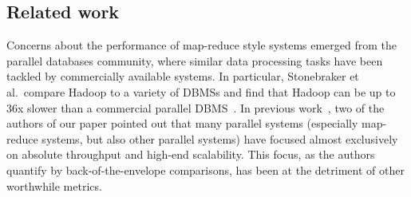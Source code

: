 


\subsection{Related work}
\label{sec:related_work}

Concerns about the performance of map-reduce style systems emerged
from the parallel databases community, where similar data processing
tasks have been tackled by commercially available systems. In
particular, Stonebraker et al.\ compare Hadoop to a variety of DBMSs
and find that Hadoop can be up to 36x slower than a commercial
parallel DBMS~\cite{stonebraker-mr}.  In previous
work~\cite{efficiencymatters}, two of the authors of our paper pointed
out that many parallel systems (especially map-reduce systems, but
also other parallel systems) have focused almost exclusively on
absolute throughput and high-end scalability.  This focus, as the
authors quantify by back-of-the-envelope comparisons, has been at the
detriment of other worthwhile metrics.

